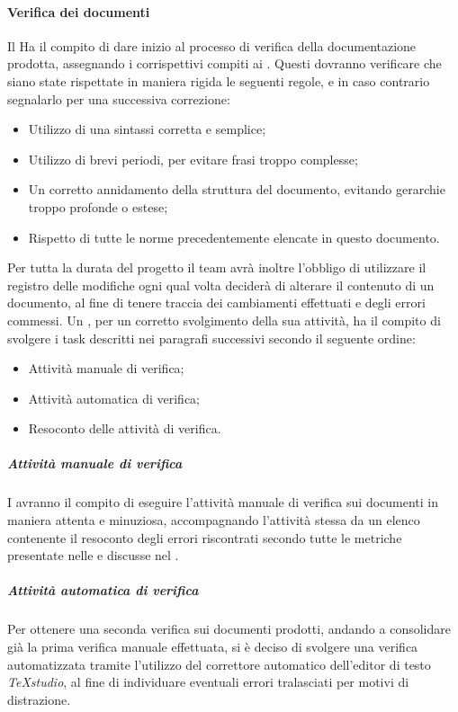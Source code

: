 	\paragraph{Verifica dei documenti}
Il \RdP{} Ha il compito di dare inizio al processo di verifica della documentazione prodotta, assegnando i corrispettivi compiti ai \vers{}. Questi dovranno verificare che siano state rispettate in maniera rigida le seguenti regole, e in caso contrario segnalarlo per una successiva correzione:
\begin{itemize}
	\item Utilizzo di una sintassi corretta e semplice;
	\item Utilizzo di brevi periodi, per evitare frasi troppo complesse;
	\item Un corretto annidamento della struttura del documento, evitando gerarchie troppo profonde o estese;
	\item Rispetto di tutte le norme precedentemente elencate in questo documento.
\end{itemize}
Per tutta la durata del progetto il team avrà inoltre l'obbligo di utilizzare il registro delle modifiche ogni qual volta deciderà di alterare il contenuto di un documento, al fine di tenere traccia dei cambiamenti effettuati e degli errori commessi.
Un \ver{}, per un corretto svolgimento della sua attività, ha il compito di svolgere i task descritti nei paragrafi successivi secondo il seguente ordine:
\begin{itemize}
	\item Attività manuale di verifica;
	\item Attività automatica di verifica;
	\item Resoconto delle attività di verifica.
\end{itemize}
\subparagraph{Attività manuale di verifica}
I \vers{} avranno il compito di eseguire l'attività manuale di verifica sui documenti in maniera attenta e minuziosa, accompagnando l'attività stessa da un elenco contenente il resoconto degli errori riscontrati secondo tutte le metriche presentate nelle \NdP{} e discusse nel \PdQ{}.

\subparagraph{Attività automatica di verifica}
Per ottenere una seconda verifica sui documenti prodotti, andando a consolidare già la prima verifica manuale effettuata, si è deciso di svolgere una verifica automatizzata tramite l'utilizzo del correttore automatico dell'editor di testo \emph{TeXstudio}, al fine di individuare eventuali errori tralasciati per motivi di distrazione.

